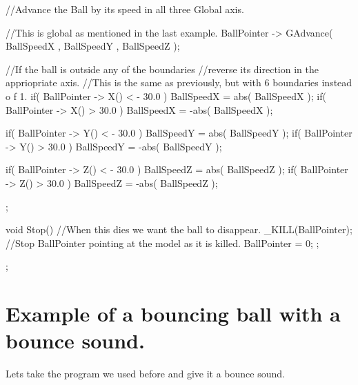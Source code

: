 \begin{DoxyCode}
{{                        //Advance the Ball by its speed in all three Global axis.
      
                        //This is global as mentioned in the last example.
                BallPointer -> GAdvance( BallSpeedX , BallSpeedY , BallSpeedZ );

                //If the ball is outside any of the boundaries
                //reverse its direction in the appriopriate axis.
                //This is the same as previously, but with 6 boundaries instead o
      f 1.
                if( BallPointer -> X()  < - 30.0 )
                {
                        BallSpeedX = abs( BallSpeedX );
                }
                if( BallPointer -> X()  >  30.0 )
                {
                        BallSpeedX = -abs( BallSpeedX );
                }

                if( BallPointer -> Y()  < - 30.0 )
                {
                        BallSpeedY = abs( BallSpeedY );
                }
                if( BallPointer -> Y()  >  30.0 )
                {
                        BallSpeedY = -abs( BallSpeedY );
                }

                if( BallPointer -> Z()  < - 30.0 )
                {
                        BallSpeedZ = abs( BallSpeedZ );
                }
                if( BallPointer -> Z()  >  30.0 )
                {
                        BallSpeedZ = -abs( BallSpeedZ );
                }

        };

        void Stop()
        {
                //When this dies we want the ball to disappear.
                _KILL(BallPointer);
                //Stop BallPointer pointing at the model as it is killed.
                BallPointer = 0;
        };
};
\end{DoxyCode}
 \hypertarget{_code_program_examples_SoundBouncingBallExample}{}\section{Example of a bouncing ball with a bounce sound.}\label{_code_program_examples_SoundBouncingBallExample}
Lets take the program we used before and give it a bounce sound.


